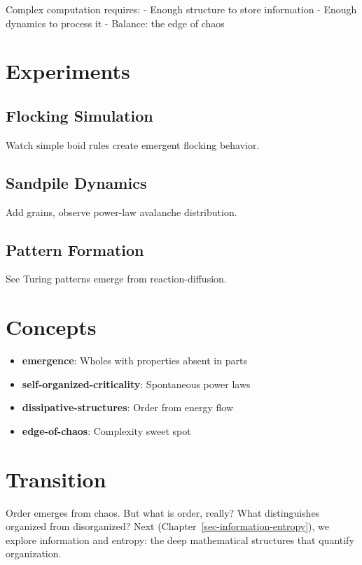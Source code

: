 \documentclass[
  11pt,
  letterpaper,
  twoside,
  openright]{book}
\providecommand{\tightlist}{%
  \setlength{\itemsep}{0pt}\setlength{\parskip}{0pt}}
\begin{document}
Complex computation requires: - Enough structure to store information -
Enough dynamics to process it - Balance: the edge of chaos

\section{Experiments}\label{experiments-37}

\subsection{Flocking Simulation}\label{flocking-simulation}

Watch simple boid rules create emergent flocking behavior.

\subsection{Sandpile Dynamics}\label{sandpile-dynamics}

Add grains, observe power-law avalanche distribution.

\subsection{Pattern Formation}\label{pattern-formation}

See Turing patterns emerge from reaction-diffusion.

\section{Concepts}\label{concepts-37}

\begin{itemize}
\tightlist
\item
  \textbf{emergence}: Wholes with properties absent in parts
\item
  \textbf{self-organized-criticality}: Spontaneous power laws
\item
  \textbf{dissipative-structures}: Order from energy flow
\item
  \textbf{edge-of-chaos}: Complexity sweet spot
\end{itemize}

\section{Transition}\label{transition-38}

Order emerges from chaos. But what is order, really? What distinguishes
organized from disorganized? Next
(Chapter~\ref{sec-information-entropy}), we explore information and
entropy: the deep mathematical structures that quantify organization.
\end{document}

